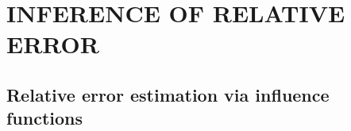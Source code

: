 \documentclass[twoside]{article}
\newcommand{\1}{{\mathbbm{1}}}
\begin{document}


\section{INFERENCE OF RELATIVE ERROR}\label{sec:relative.error}



\subsection{Relative error estimation via influence functions}\label{sec:relative.error.estimation}
\end{document}
